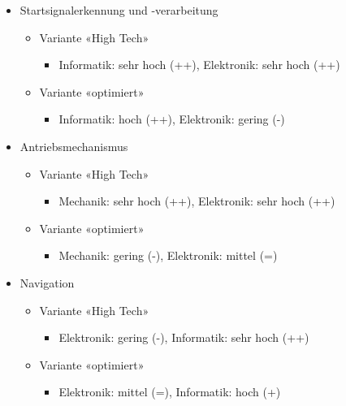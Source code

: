 \documentclass[a4paper,11pt]{scrartcl}
\begin{document}
\begin{itemize}
    \item Startsignalerkennung und -verarbeitung
        \begin{itemize}
            \item Variante «High Tech»
            \begin{itemize}
                \item Informatik: sehr hoch (++), Elektronik: sehr hoch (++)
            \end{itemize}
            \item Variante «optimiert»
            \begin{itemize}
                \item Informatik: hoch (++), Elektronik: gering (-)
            \end{itemize}
        \end{itemize}
    \item Antriebsmechanismus
        \begin{itemize}
            \item Variante «High Tech»
            \begin{itemize}
                \item Mechanik: sehr hoch (++), Elektronik: sehr hoch (++)
            \end{itemize}
            \item Variante «optimiert»
            \begin{itemize}
                \item Mechanik: gering (-), Elektronik: mittel (=)
            \end{itemize}
        \end{itemize}
    \item Navigation
        \begin{itemize}
            \item Variante «High Tech»
            \begin{itemize}
                \item Elektronik: gering (-), Informatik: sehr hoch (++)
            \end{itemize}
            \item Variante «optimiert»
            \begin{itemize}
                \item Elektronik: mittel (=), Informatik: hoch (+)
            \end{itemize}
        \end{itemize}
\end{itemize}
\end{document}
